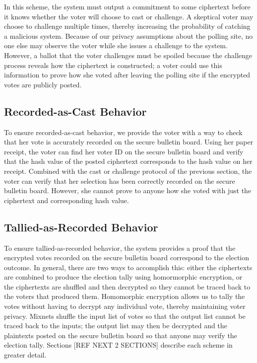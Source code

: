 In this scheme, the system must output a commitment to some ciphertext before it knows whether the voter will choose to cast or challenge. A skeptical voter may choose to challenge multiple times, thereby increasing the probability of catching a malicious system. Because of our privacy assumptions about the polling site, no one else may observe the voter while she issues a challenge to the system. However, a ballot that the voter challenges must be spoiled because the challenge process reveals how the ciphertext is constructed; a voter could use this information to prove how she voted after leaving the polling site if the encrypted votes are publicly posted.

\subsection{Recorded-as-Cast Behavior}

To ensure recorded-as-cast behavior, we provide the voter with a way to check that her vote is accurately recorded on the secure bulletin board. Using her paper receipt, the voter can find her voter ID on the secure bulletin board and verify that the hash value of the posted ciphertext corresponds to the hash value on her receipt. Combined with the cast or challenge protocol of the previous section, the voter can verify that her selection has been correctly recorded on the secure bulletin board. However, she cannot prove to anyone how she voted with just the ciphertext and corresponding hash value.

\subsection{Tallied-as-Recorded Behavior}

To ensure tallied-as-recorded behavior, the system provides a proof that the encrypted votes recorded on the secure bulletin board correspond to the election outcome. In general, there are two ways to accomplish this: either the ciphertexts are combined to produce the election tally using homormorphic encryption, or the ciphertexts are shuffled and then decrypted so they cannot be traced back to the voters that produced them. Homomorphic encryption allows us to tally the votes without having to decrypt any individual vote, thereby maintaining voter privacy. Mixnets shuffle the input list of votes so that the output list cannot be traced back to the inputs; the output list may then be decrypted and the plaintexts posted on the secure bulletin board so that anyone may verify the election tally. Sections [REF NEXT 2 SECTIONS] describe each scheme in greater detail.

